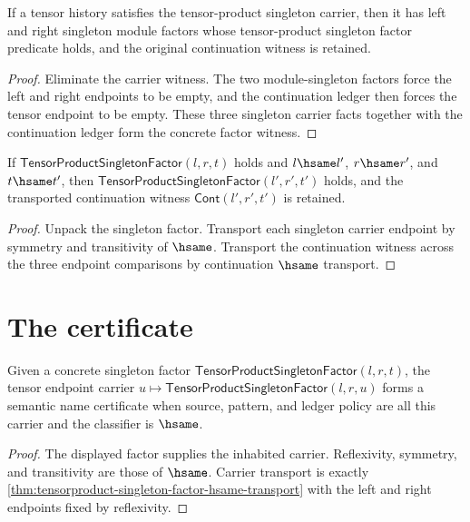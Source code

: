 \begin{theorem}
\label{thm:tensorproduct-singleton-carrier-factor-witness}
If a tensor history satisfies the tensor-product singleton carrier, then it has
left and right singleton module factors whose tensor-product singleton factor
predicate holds, and the original continuation witness is retained.
\end{theorem}
\begin{proof}
Eliminate the carrier witness. The two module-singleton factors force the left
and right endpoints to be empty, and the continuation ledger then forces the
tensor endpoint to be empty. These three singleton carrier facts together with
the continuation ledger form the concrete factor witness.
\end{proof}

\begin{theorem}
\label{thm:tensorproduct-singleton-factor-hsame-transport}
If $\mathsf{TensorProductSingletonFactor}(l,r,t)$ holds and
$l\hsame l'$, $r\hsame r'$, and $t\hsame t'$, then
$\mathsf{TensorProductSingletonFactor}(l',r',t')$ holds, and the transported
continuation witness $\mathsf{Cont}(l',r',t')$ is retained.
\end{theorem}
\begin{proof}
Unpack the singleton factor. Transport each singleton carrier endpoint by
symmetry and transitivity of $\hsame$. Transport the continuation witness
across the three endpoint comparisons by continuation $\hsame$ transport.
\end{proof}

\section{The certificate}
\label{sec:tensorproduct-certificate}

\begin{theorem}
\label{thm:tensorproduct-singleton-factor-tensor-semantic-namecert}
Given a concrete singleton factor
$\mathsf{TensorProductSingletonFactor}(l,r,t)$, the tensor endpoint carrier
$u\mapsto\mathsf{TensorProductSingletonFactor}(l,r,u)$ forms a semantic name
certificate when source, pattern, and ledger policy are all this carrier and
the classifier is $\hsame$.
\end{theorem}
\begin{proof}
The displayed factor supplies the inhabited carrier. Reflexivity, symmetry,
and transitivity are those of $\hsame$. Carrier transport is exactly
\autoref{thm:tensorproduct-singleton-factor-hsame-transport} with the left and
right endpoints fixed by reflexivity.
\end{proof}


